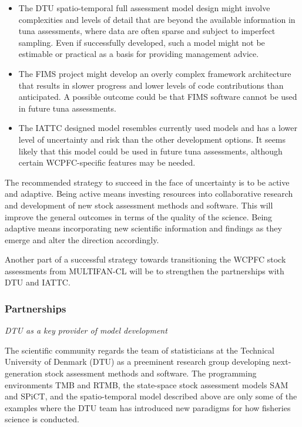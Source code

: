 \documentclass{SCreport}
\begin{document}
\begin{itemize}
  \item The DTU spatio-temporal full assessment model design might involve
  complexities and levels of detail that are beyond the available information in
  tuna assessments, where data are often sparse and subject to imperfect
  sampling. Even if successfully developed, such a model might not be estimable
  or practical as a basis for providing management advice.\\[-2.5ex]
  \item The FIMS project might develop an overly complex framework architecture
  that results in slower progress and lower levels of code contributions than
  anticipated. A possible outcome could be that FIMS software cannot be used in
  future tuna assessments.\\[-2.5ex]
  \item The IATTC designed model resembles currently used models and has a lower
  level of uncertainty and risk than the other development options. It seems
  likely that this model could be used in future tuna assessments, although
  certain WCPFC-specific features may be needed.
\end{itemize}

\newpage

The recommended strategy to succeed in the face of uncertainty is to be active
and adaptive. Being active means investing resources into collaborative research
and development of new stock assessment methods and software. This will improve
the general outcomes in terms of the quality of the science. Being adaptive
means incorporating new scientific information and findings as they emerge and
alter the direction accordingly.

Another part of a successful strategy towards transitioning the WCPFC stock
assessments from MULTIFAN-CL will be to strengthen the partnerships with DTU and
IATTC.

\vspace{2ex}

\subsubsection{Partnerships}

\textit{DTU as a key provider of model development}

The scientific community regards the team of statisticians at the Technical
University of Denmark (DTU) as a preeminent research group developing
next-generation stock assessment methods and software. The programming
environments TMB and RTMB, the state-space stock assessment models SAM and
SPiCT, and the spatio-temporal model described above are only some of the
examples where the DTU team has introduced new paradigms for how fisheries
science is conducted.
\end{document}
